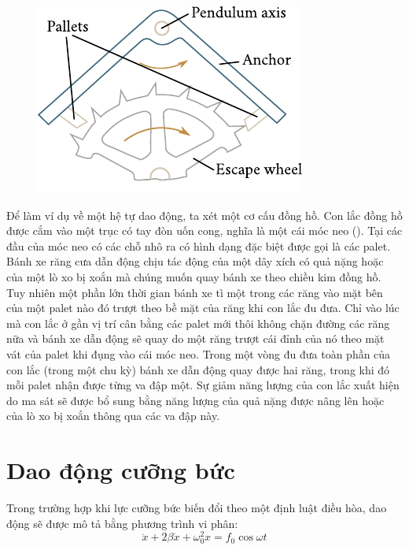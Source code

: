 \begin{figure}[!htb]
	\begin{center}
		\includegraphics[scale=0.95]{figures/ch_07/fig_7_21.pdf}
		\caption[]{}
		\label{fig:7_21}
	\end{center}
\end{figure}

Để làm ví dụ về một hệ tự dao động, ta xét một cơ cấu đồng hồ. Con lắc đồng hồ được cắm vào một trục có tay đòn uốn cong, nghĩa là một cái móc neo (). Tại các đầu của móc neo có các chỗ nhô ra có hình dạng đặc biệt được gọi là các palet. Bánh xe răng cưa dẫn động chịu tác động của một dây xích có quả nặng hoặc của một lò xo bị xoắn mà chúng muốn quay bánh xe theo chiều kim đồng hồ. Tuy nhiên một phần lớn thời gian bánh xe tì một trong các răng vào mặt bên của một palet nào đó trượt theo bề mặt của răng khi con lắc đu đưa. Chỉ vào lúc mà con lắc ở gần vị trí cân bằng các palet mới thôi không chặn đường các răng nữa và bánh xe dẫn động sẽ quay do một răng trượt cái đỉnh của nó theo mặt vát của palet khi đụng vào cái móc neo. Trong một vòng đu đưa toàn phần của con lắc (trong một chu kỳ) bánh xe dẫn động quay được hai răng, trong khi đó mỗi palet nhận được từng va đập một. Sự giảm năng lượng của con lắc xuất hiện do ma sát sẽ được bổ sung bằng năng lượng của quả nặng được nâng lên hoặc của lò xo bị xoắn thông qua các va đập này.

\section{Dao động cưỡng bức}\label{sec:7_12}

Trong trường hợp khi lực cưỡng bức biến đổi theo một định luật điều hòa, dao động sẽ được mô tả bằng phương trình vi phân:
\begin{equation}\label{eq:7_111}
	\ddot{x} + 2\beta\dot{x} + \omega_0^2 x = f_0\cos\omega t
\end{equation}

